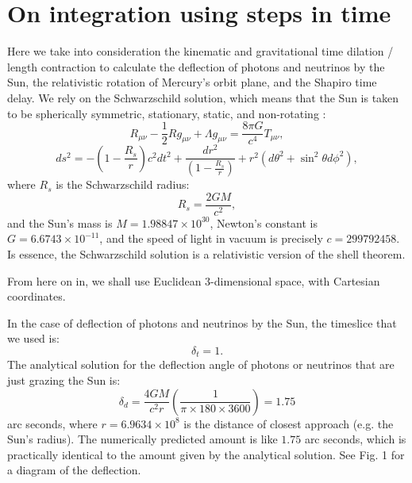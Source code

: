 \documentclass[12pt]{article}
\begin{document}
\section{On integration using steps in time}

Here we take into consideration the kinematic and gravitational time dilation / length contraction to calculate the deflection of photons and neutrinos by the Sun, the relativistic rotation of Mercury's orbit plane, and the Shapiro time delay.
We rely on the Schwarzschild solution, which means that the Sun is taken to be spherically symmetric, stationary, static, and non-rotating \cite{einstein, misner, schutz, mcmahon}:
\begin{equation}
\label{efe}
R_{\mu\nu} - \frac{1}{2} R g_{\mu\nu} + \Lambda g_{\mu\nu} = \frac{8\pi G}{c^4} T_{\mu\nu},
\end{equation}
\begin{equation}
\label{schwarzschild_line_element}
ds^2 = -\left( 1 - \frac{R_{s}}{r} \right) c^2 dt^2 + \frac{dr^2}{\left( 1 - \frac{R_{s}}{r} \right)} + r^2 (d\theta^2 + \sin^2 \theta d\phi^2),
\end{equation}
where $R_{s}$ is the Schwarzschild radius:
\begin{equation}
\label{schwarzschild_radius}
R_{s} = \frac{2GM}{c^2},
\end{equation}
and the Sun's mass is $M = 1.98847 \times 10^{30}$, Newton's constant is $G = 6.6743 \times 10^{-11}$, and the speed of light in vacuum is precisely $c = 299792458$.
Is essence, the Schwarzschild solution is a relativistic version of the shell theorem.





From here on in, we shall use Euclidean 3-dimensional space, with Cartesian coordinates.





In the case of deflection of photons and neutrinos by the Sun, the timeslice that we used is:
\begin{equation}
\label{dt_1}
\delta_{t} = 1.
\end{equation}
The analytical solution for the deflection angle of photons or neutrinos that are just grazing the Sun is:
\begin{equation}
\label{delta_d}
\delta_{d} = \frac{4GM}{c^2 r} \left( \frac{1}{\pi \times 180 \times 3600} \right) = 1.75
\end{equation}
arc seconds, where $r = 6.9634 \times 10^8$ is the distance of closest approach (e.g. the Sun's radius).
The numerically predicted amount is like $1.75$ arc seconds, which is practically identical to the amount given by the analytical solution.
See Fig. 1 for a diagram of the deflection.
\end{document}
